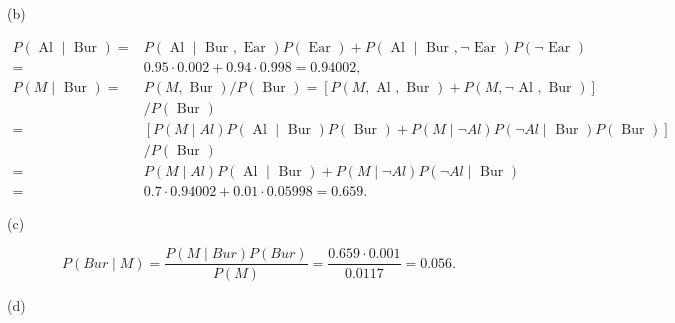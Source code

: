 \documentclass[10pt]{book}
\begin{document}
(b)

$$
\begin{aligned}
P(\text { Al } \mid \text { Bur })= & P(\text { Al } \mid \text { Bur }, \text { Ear }) P(\text { Ear })+P(\text { Al } \mid \text { Bur }, \neg \text { Ear }) P(\neg \text { Ear }) \\
= & 0.95 \cdot 0.002+0.94 \cdot 0.998=0.94002, \\
P(M \mid \text { Bur })= & P(M, \text { Bur }) / P(\text { Bur })=[P(M, \text { Al }, \text { Bur })+P(M, \neg \text { Al }, \text { Bur })] \\
& / P(\text { Bur }) \\
= & {[P(M \mid A l) P(\text { Al } \mid \text { Bur }) P(\text { Bur })+P(M \mid \neg A l) P(\neg A l \mid \text { Bur }) P(\text { Bur })] } \\
& / P(\text { Bur }) \\
= & P(M \mid A l) P(\text { Al } \mid \text { Bur })+P(M \mid \neg A l) P(\neg A l \mid \text { Bur }) \\
= & 0.7 \cdot 0.94002+0.01 \cdot 0.05998=0.659 .
\end{aligned}
$$

(c)

$$
P(B u r \mid M)=\frac{P(M \mid B u r) P(B u r)}{P(M)}=\frac{0.659 \cdot 0.001}{0.0117}=0.056 .
$$

(d)
\end{document}
